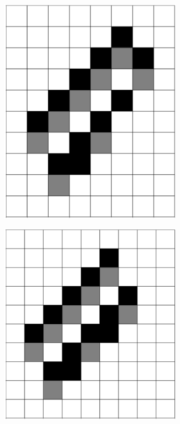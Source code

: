 \documentclass[12pt]{article}
\numberwithin{figure}{section} %
\begin{document}
\begin{figure}[H]
\centering
 \begin{subfigure}{0.2\textwidth}
     \centering
     \includegraphics[angle=270,width=\linewidth]{Section4/24.0}
     \subcaption{}
   \end{subfigure}
   \hspace{2cm}
     \begin{subfigure}{0.2\textwidth}
     \centering
     \includegraphics[angle=270,width=\linewidth]{Section4/24.1}

\end{subfigure}
\end{figure}
\end{document}
